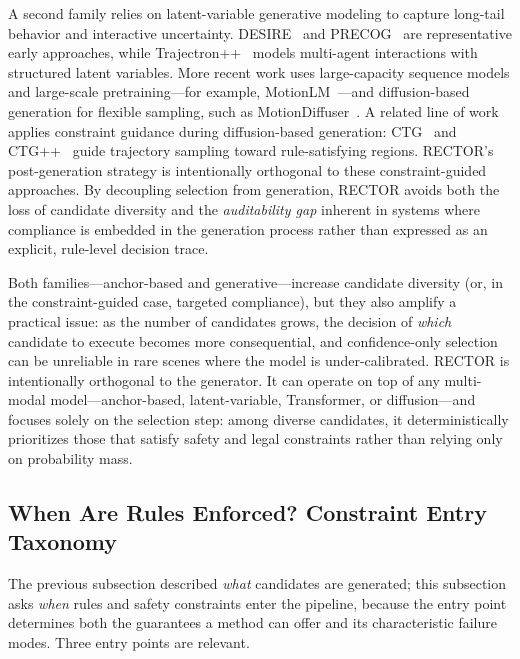 A second family relies on latent-variable generative modeling to capture long-tail behavior and interactive uncertainty.  DESIRE~\cite{lee2017desire} and PRECOG~\cite{rhinehart2019precog} are representative early approaches, while Trajectron++~\cite{salzmann2020trajectron} models multi-agent interactions with structured latent variables.  More recent work uses large-capacity sequence models and large-scale pretraining---for example, MotionLM~\cite{seff2023motionlm}---and diffusion-based generation for flexible sampling, such as MotionDiffuser~\cite{jiang2023motiondiffuser}.  A related line of work applies constraint guidance during diffusion-based generation: CTG~\cite{zhong2023ctg} and CTG++~\cite{zhong2023ctgpp} guide trajectory sampling toward rule-satisfying regions.  \textsc{RECTOR}'s post-generation strategy is intentionally orthogonal to these constraint-guided approaches.  By decoupling selection from generation, \textsc{RECTOR} avoids both the loss of candidate diversity and the \emph{auditability gap} inherent in systems where compliance is embedded in the generation process rather than expressed as an explicit, rule-level decision trace.

Both families---anchor-based and generative---increase candidate diversity (or, in the constraint-guided case, targeted compliance), but they also amplify a practical issue: as the number of candidates grows, the decision of \emph{which} candidate to execute becomes more consequential, and confidence-only selection can be unreliable in rare scenes where the model is under-calibrated.  RECTOR is intentionally orthogonal to the generator.  It can operate on top of any multi-modal model---anchor-based, latent-variable, Transformer, or diffusion---and focuses solely on the selection step: among diverse candidates, it deterministically prioritizes those that satisfy safety and legal constraints rather than relying only on probability mass.

\subsection{When Are Rules Enforced? Constraint Entry Taxonomy}
\label{subsec:constraint_entry_taxonomy}

The previous subsection described \emph{what} candidates are generated; this subsection asks \emph{when} rules and safety constraints enter the pipeline, because the entry point determines both the guarantees a method can offer and its characteristic failure modes.  Three entry points are relevant.

